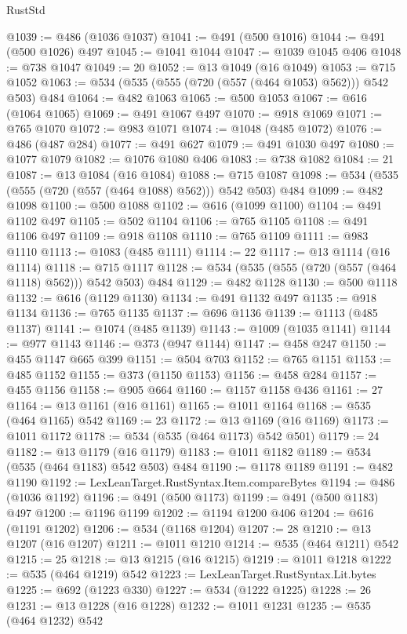 \begin{lexlean}{RustStd}
\begin{coremodule}
@1039 := @486 (@1036 @1037)
@1041 := @491 (@500 @1016)
@1044 := @491 (@500 @1026) @497
@1045 := @1041 @1044
@1047 := @1039 @1045 @406
@1048 := @738 @1047
@1049 := 20
@1052 := @13 @1049 (@16 @1049)
@1053 := @715 @1052
@1063 := @534 (@535 (@555 (@720 (@557 (@464 @1053) @562))) @542 @503) @484
@1064 := @482 @1063
@1065 := @500 @1053
@1067 := @616 (@1064 @1065)
@1069 := @491 @1067 @497
@1070 := @918 @1069
@1071 := @765 @1070
@1072 := @983 @1071
@1074 := @1048 (@485 @1072)
@1076 := @486 (@487 @284)
@1077 := @491 @627
@1079 := @491 @1030 @497
@1080 := @1077 @1079
@1082 := @1076 @1080 @406
@1083 := @738 @1082
@1084 := 21
@1087 := @13 @1084 (@16 @1084)
@1088 := @715 @1087
@1098 := @534 (@535 (@555 (@720 (@557 (@464 @1088) @562))) @542 @503) @484
@1099 := @482 @1098
@1100 := @500 @1088
@1102 := @616 (@1099 @1100)
@1104 := @491 @1102 @497
@1105 := @502 @1104
@1106 := @765 @1105
@1108 := @491 @1106 @497
@1109 := @918 @1108
@1110 := @765 @1109
@1111 := @983 @1110
@1113 := @1083 (@485 @1111)
@1114 := 22
@1117 := @13 @1114 (@16 @1114)
@1118 := @715 @1117
@1128 := @534 (@535 (@555 (@720 (@557 (@464 @1118) @562))) @542 @503) @484
@1129 := @482 @1128
@1130 := @500 @1118
@1132 := @616 (@1129 @1130)
@1134 := @491 @1132 @497
@1135 := @918 @1134
@1136 := @765 @1135
@1137 := @696 @1136
@1139 := @1113 (@485 @1137)
@1141 := @1074 (@485 @1139)
@1143 := @1009 (@1035 @1141)
@1144 := @977 @1143
@1146 := @373 (@947 @1144)
@1147 := @458 @247
@1150 := @455 @1147 @665 @399
@1151 := @504 @703
@1152 := @765 @1151
@1153 := @485 @1152
@1155 := @373 (@1150 @1153)
@1156 := @458 @284
@1157 := @455 @1156
@1158 := @905 @664
@1160 := @1157 @1158 @436
@1161 := 27
@1164 := @13 @1161 (@16 @1161)
@1165 := @1011 @1164
@1168 := @535 (@464 @1165) @542
@1169 := 23
@1172 := @13 @1169 (@16 @1169)
@1173 := @1011 @1172
@1178 := @534 (@535 (@464 @1173) @542 @501)
@1179 := 24
@1182 := @13 @1179 (@16 @1179)
@1183 := @1011 @1182
@1189 := @534 (@535 (@464 @1183) @542 @503) @484
@1190 := @1178 @1189
@1191 := @482 @1190
@1192 := LexLeanTarget.RustSyntax.Item.compareBytes
@1194 := @486 (@1036 @1192)
@1196 := @491 (@500 @1173)
@1199 := @491 (@500 @1183) @497
@1200 := @1196 @1199
@1202 := @1194 @1200 @406
@1204 := @616 (@1191 @1202)
@1206 := @534 (@1168 @1204)
@1207 := 28
@1210 := @13 @1207 (@16 @1207)
@1211 := @1011 @1210
@1214 := @535 (@464 @1211) @542
@1215 := 25
@1218 := @13 @1215 (@16 @1215)
@1219 := @1011 @1218
@1222 := @535 (@464 @1219) @542
@1223 := LexLeanTarget.RustSyntax.Lit.bytes
@1225 := @692 (@1223 @330)
@1227 := @534 (@1222 @1225)
@1228 := 26
@1231 := @13 @1228 (@16 @1228)
@1232 := @1011 @1231
@1235 := @535 (@464 @1232) @542

\end{coremodule}
\end{lexlean}
